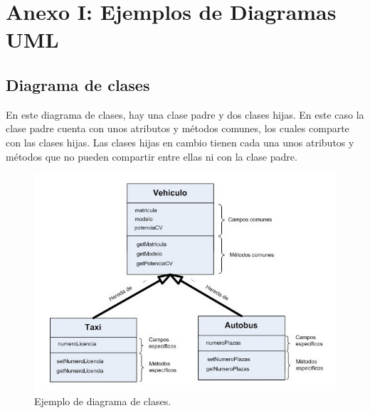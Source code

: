 \documentclass[a4paper, 12pt]{book}
\begin{document}



\cleardoublepage
\appendix

\chapter{Anexo I: Ejemplos de Diagramas UML}
\label{app:diagramas}

\section{Diagrama de clases}
En este diagrama de clases, hay una clase padre y dos clases hijas. En este caso la clase padre cuenta con unos atributos y métodos comunes, los cuales comparte con las clases hijas. Las clases hijas en cambio tienen cada una unos atributos y métodos que no pueden compartir entre ellas ni con la clase padre.
\begin{figure}
	\centering
	\includegraphics[width=14cm, keepaspectratio]{img/diagrama_clases.png}
	\caption{Ejemplo de diagrama de clases.}\label{fig:diagrama_clases}
\end{figure}
\end{document}
